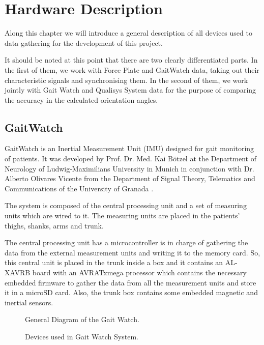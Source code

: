 \chapter{Hardware Description}
\label{ch:Hardware}
Along this chapter we will introduce a general description of all devices used to data gathering for the development of this project.


It should be noted at this point that there are two clearly differentiated parts. In the first of them, we work with Force Plate and GaitWatch data, taking out their characteristic signals and synchronising them. In the second of them, we work jointly with Gait Watch and Qualisys System data for the purpose of comparing the accuracy in the calculated orientation angles.


\section{GaitWatch}

GaitWatch is an Inertial Measurement Unit (IMU) designed for gait monitoring of patients. It was developed by Prof. Dr. Med. Kai Bötzel at the Department of Neurology of Ludwig-Maximilians University in Munich in conjunction with Dr. Alberto Olivares Vicente from the Department of Signal Theory, Telematics and Communications of the University of Granada \cite{OlivaresBotzel2013}.

The system is composed of the central processing unit and
a set of measuring units which are wired to it. The measuring units are 
placed in the patients’ thighs, shanks, arms and trunk.

The central processing unit has a microcontroller is in charge of gathering the data from the external measurement units and writing it to the memory card. So, this central unit is placed in the trunk inside a box and it contains an AL-XAVRB board with an AVRATxmega processor which contains the necessary embedded firmware to gather the data from all the measurement units and store it in a microSD card. Also, the trunk box contains some embedded magnetic and inertial sensors.

\begin{figure}[H]
	\centering
	\caption{General Diagram of the Gait Watch.}
	\label{fig:diagram}
\end{figure}



\begin{figure}[H]
	\centering
	\caption{Devices used in Gait Watch System.}
	\label{fig:devicesGW}
\end{figure}

